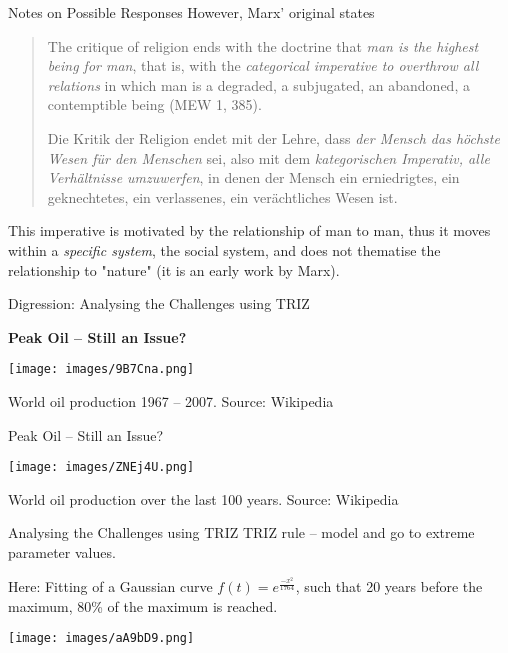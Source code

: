 \documentclass{beamer}
\newcommand{\ueberschrift}[1]{\begin{center}\bf #1\end{center}}
\begin{document}
\begin{frame}{Notes on Possible Responses}
  However, Marx' original states
  \begin{quote}\rm
    The critique of religion ends with the doctrine that \emph{man is the
      highest being for man}, that is, with the \emph{categorical imperative
      to overthrow all relations} in which man is a degraded, a subjugated, an
    abandoned, a contemptible being (MEW 1, 385).\medskip

    Die Kritik der Religion endet mit der Lehre, dass \emph{der Mensch das
      höchste Wesen für den Menschen} sei, also mit dem \emph{kategorischen
      Imperativ, alle Verhältnisse umzuwerfen}, in denen der Mensch ein
    erniedrigtes, ein geknechtetes, ein verlassenes, ein verächtliches Wesen
    ist.
  \end{quote}
  This imperative is motivated by the relationship of man to man, thus it
  moves within a \emph{specific system}, the social system, and does not
  thematise the relationship to "nature" (it is an early work by Marx).
\end{frame}

\begin{frame}{Digression: Analysing the Challenges using TRIZ}

  \ueberschrift{Peak Oil -- Still an Issue?}

  \begin{center}
    \texttt{[image: images/9B7Cna.png]}
  
    World oil production 1967 -- 2007. Source: Wikipedia
  \end{center}
\end{frame}

\begin{frame}{Peak Oil -- Still an Issue?}

  \begin{center}
    \texttt{[image: images/ZNEj4U.png]}
  
    World oil production over the last 100 years. Source: Wikipedia
  \end{center}
\end{frame}

\begin{frame}{Analysing the Challenges using TRIZ}
  TRIZ rule -- model and go to extreme parameter values.

  Here: Fitting of a Gaussian curve $f(t)=e^{\frac{-x^2}{1764}}$, such that 20
  years before the maximum, 80\% of the maximum is reached.
  \begin{center}
    \texttt{[image: images/aA9bD9.png]}
  \end{center}
\end{frame}
\end{document}
